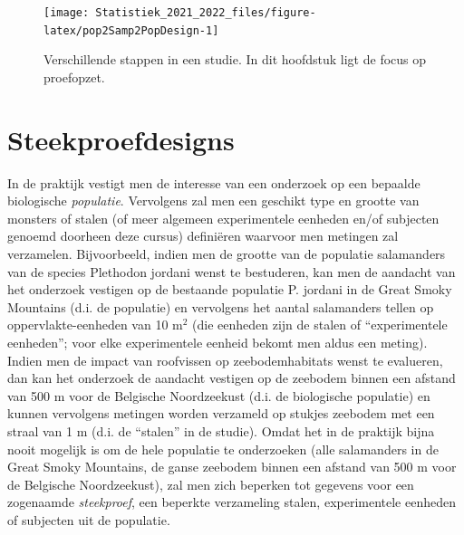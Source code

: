\documentclass[
  12pt,dutch,coursenotes]{book}
\theoremstyle{definition}
\theoremstyle{definition}
\theoremstyle{definition}
\theoremstyle{definition}
\theoremstyle{remark}
\begin{document}
\begin{figure}

{\centering \texttt{[image: Statistiek\_2021\_2022\_files/figure-latex/pop2Samp2PopDesign-1]} 

}

\caption{Verschillende stappen in een studie. In dit hoofdstuk ligt de focus op proefopzet.}\label{fig:pop2Samp2PopDesign}
\end{figure}

\hypertarget{sec:steekproefdesigns}{%
\section{Steekproefdesigns}\label{sec:steekproefdesigns}}

In de praktijk vestigt men de interesse van een onderzoek op een bepaalde biologische \emph{populatie}. Vervolgens zal men een geschikt type en grootte van monsters of stalen (of meer algemeen experimentele eenheden en/of subjecten genoemd doorheen deze cursus) definiëren waarvoor men metingen zal verzamelen. Bijvoorbeeld, indien men de grootte van de populatie salamanders van de species Plethodon jordani wenst te bestuderen, kan men de aandacht van het onderzoek vestigen op de bestaande populatie P. jordani in de Great Smoky Mountains (d.i. de populatie) en vervolgens het aantal salamanders tellen op oppervlakte-eenheden van 10 m\(^2\) (die eenheden zijn de stalen of ``experimentele eenheden''; voor elke experimentele eenheid bekomt men aldus een meting). Indien men de impact van roofvissen op zeebodemhabitats wenst te evalueren, dan kan het onderzoek de aandacht vestigen op de zeebodem binnen een afstand van 500 m voor de Belgische Noordzeekust (d.i. de biologische populatie) en kunnen vervolgens metingen worden verzameld op stukjes zeebodem met een straal van 1 m (d.i. de ``stalen'' in de studie). Omdat het in de praktijk bijna nooit mogelijk is om de hele populatie te onderzoeken (alle salamanders in de Great Smoky Mountains, de ganse zeebodem binnen een afstand van 500 m voor de Belgische Noordzeekust), zal men zich beperken tot gegevens voor een zogenaamde \emph{steekproef}, een beperkte verzameling stalen, experimentele eenheden of subjecten uit de populatie.
\end{document}
